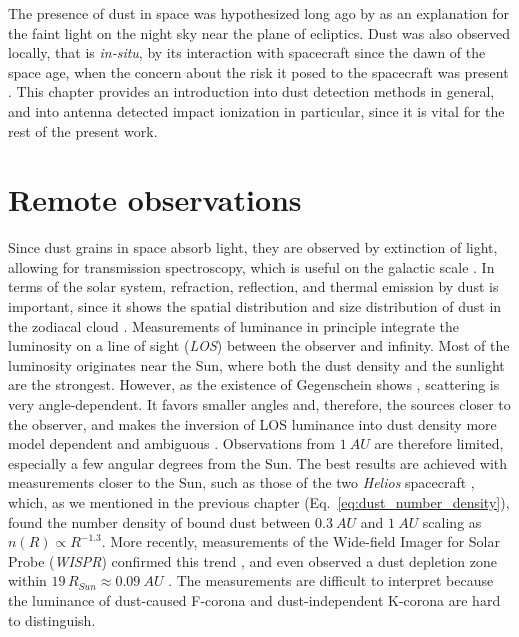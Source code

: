 The presence of dust in space was hypothesized long ago by \citet{cassini1685} as an explanation for the faint light on the night sky near the plane of ecliptics. Dust was also observed locally, that is \textit{in-situ}, by its interaction with spacecraft since the dawn of the space age, when the concern about the risk it posed to the spacecraft was present \citep{whipple1958meteoritic}. This chapter provides an introduction into dust detection methods in general, and into antenna detected impact ionization in particular, since it is vital for the rest of the present work.

\section{Remote observations}

Since dust grains in space absorb light, they are observed by extinction of light, \citep{desert1990interstellar} allowing for transmission spectroscopy, which is useful on the galactic scale \citep{mann2010interstellar}. In terms of the solar system, refraction, reflection, and thermal emission by dust is important, since it shows the spatial distribution and size distribution of dust in the zodiacal cloud \citep{allen1946spectrum,hulst1947zodiacal,leinert1981zodiacal,stenborg2018characterization,stenborg2021psp}. Measurements of luminance in principle integrate the luminosity on a line of sight (\textit{LOS}) between the observer and infinity. Most of the luminosity originates near the Sun, where both the dust density and the sunlight are the strongest. However, as the existence of Gegenschein shows \citep{roosen1971gegenschein}, scattering is very angle-dependent. It favors smaller angles and, therefore, the sources closer to the observer, and makes the inversion of LOS luminance into dust density more model dependent and ambiguous \citep{mann2004dust,kneissel1991spatial}. Observations from $\SI{1}{AU}$ are therefore limited, especially a few angular degrees from the Sun. The best results are achieved with measurements closer to the Sun, such as those of the two \textit{Helios} spacecraft \cite{leinert1981zodiacal}, which, as we mentioned in the previous chapter (Eq.~\ref{eq:dust_number_density}), found the number density of bound dust between $\SI{0.3}{AU}$ and $\SI{1}{AU}$ scaling as $n(R) \propto R^{-1.3}$. More recently, measurements of the Wide-field Imager for Solar Probe (\textit{WISPR}) confirmed this trend \citep{stenborg2021psp}, and even observed a dust depletion zone within $19 \, R_{Sun} \approx \SI{0.09}{AU}$ \citep{stenborg2022psp}. The measurements are difficult to interpret because the luminance of dust-caused F-corona and dust-independent K-corona are hard to distinguish. 

